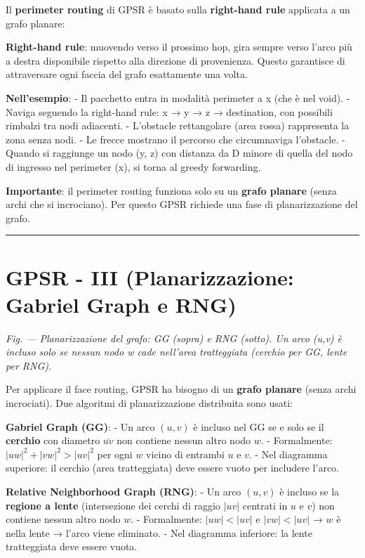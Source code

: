 \documentclass[
  italian,
  openany]{book}
\begin{document}
Il \textbf{perimeter routing} di GPSR è basato sulla \textbf{right-hand
rule} applicata a un grafo planare:

\textbf{Right-hand rule}: muovendo verso il prossimo hop, gira sempre
verso l'arco più a destra disponibile rispetto alla direzione di
provenienza. Questo garantisce di attraversare ogni faccia del grafo
esattamente una volta.

\textbf{Nell'esempio}: - Il pacchetto entra in modalità perimeter a x
(che è nel void). - Naviga seguendo la right-hand rule: x → y → z →
destination, con possibili rimbalzi tra nodi adiacenti. - L'obstacle
rettangolare (area rossa) rappresenta la zona senza nodi. - Le frecce
mostrano il percorso che circumnaviga l'obstacle. - Quando si raggiunge
un nodo (y, z) con distanza da D minore di quella del nodo di ingresso
nel perimeter (x), si torna al greedy forwarding.

\textbf{Importante}: il perimeter routing funziona solo su un
\textbf{grafo planare} (senza archi che si incrociano). Per questo GPSR
richiede una fase di planarizzazione del grafo.

\begin{center}\rule{0.5\linewidth}{0.5pt}\end{center}

\section{GPSR - III (Planarizzazione: Gabriel Graph e
RNG)}\label{gpsr---iii-planarizzazione-gabriel-graph-e-rng}

\emph{Fig. --- Planarizzazione del grafo: GG (sopra) e RNG (sotto). Un
arco (u,v) è incluso solo se nessun nodo w cade nell'area tratteggiata
(cerchio per GG, lente per RNG).}

Per applicare il face routing, GPSR ha bisogno di un \textbf{grafo
planare} (senza archi incrociati). Due algoritmi di planarizzazione
distribuita sono usati:

\textbf{Gabriel Graph (GG)}: - Un arco \((u, v)\) è incluso nel GG se e
solo se il \textbf{cerchio} con diametro \(\overline{uv}\) non contiene
nessun altro nodo \(w\). - Formalmente: \(|uw|^2 + |vw|^2 > |uv|^2\) per
ogni \(w\) vicino di entrambi \(u\) e \(v\). - Nel diagramma superiore:
il cerchio (area tratteggiata) deve essere vuoto per includere l'arco.

\textbf{Relative Neighborhood Graph (RNG)}: - Un arco \((u, v)\) è
incluso se la \textbf{regione a lente} (intersezione dei cerchi di
raggio \(|uv|\) centrati in \(u\) e \(v\)) non contiene nessun altro
nodo \(w\). - Formalmente: \(|uw| < |uv|\) e \(|vw| < |uv|\) → \(w\) è
nella lente → l'arco viene eliminato. - Nel diagramma inferiore: la
lente tratteggiata deve essere vuota.
\end{document}
